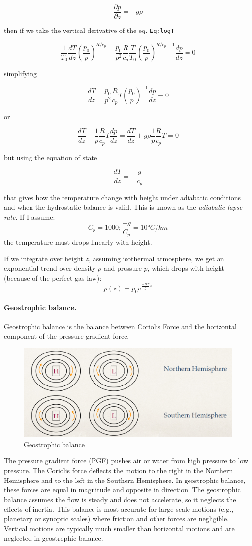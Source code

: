 \[\frac{\partial p}{\partial z} =  -g \rho\]

then if we take the vertical derivative of the eq. \texttt{Eq:logT}

\[\frac{1}{T_0}\frac{d T}{dz}\left(\frac{p_0}{p}\right)^{R/c_p} -\frac{p_0}{p^2}\frac{R}{c_p}\frac{T}{T_0}\left(\frac{p_0}{p}\right)^{R/c_p-1}\frac{d p}{dz} = 0\]

simplifying

\[\frac{d T}{dz} -\frac{p_0}{p^2}\frac{R}{c_p}T\left(\frac{p_0}{p}\right)^{-1}\frac{d p}{dz} = 0\]

or

\[\frac{d T}{dz} -\frac{1}{p}\frac{R}{c_p}T\frac{d p}{dz} = \frac{d T}{dz} +g\rho\frac{1}{p}\frac{R}{c_p}T = 0\]

but using the equation of state

\[\frac{d T}{dz} = -\frac{g}{c_p}\]

that gives how the temperature change with height under adiabatic
conditions and when the hydrostatic balance is valid. This is known as
the \emph{adiabatic lapse rate}. If I assume:
$$C_p= 1000;   \frac{-g}{C_p} =10°C/km$$
the temperature must drops linearly with height.

If we integrate over height $z$, assuming isothermal atmosphere, we get an exponential trend over density $\rho$ and pressure $p$, which drops with height (because of the perfect gas law):
$$p(z)=p_0 e^{\frac{-RT}{g}z}$$
\paragraph{Geostrophic balance.} Geostrophic balance is the balance between Coriolis Force and the horizontal component of the pressure gradient force.
\begin{figure}
    \centering
    \includegraphics[width=0.5\linewidth]{uploads/Screenshot 2024-11-20 195919.png}
    \caption{Geostrophic balance}
    \label{fig:enter-label}
\end{figure}
The pressure gradient force (PGF) pushes air or water from high pressure to low pressure. The Coriolis force deflects the motion to the right in the Northern Hemisphere and to the left in the Southern Hemisphere. In geostrophic balance, these forces are equal in magnitude and opposite in direction. The geostrophic balance assumes the flow is steady and does not accelerate, so it neglects the effects of inertia. This balance is most accurate for large-scale motions (e.g., planetary or synoptic scales) where friction and other forces are negligible. Vertical motions are typically much smaller than horizontal motions and are neglected in geostrophic balance.

